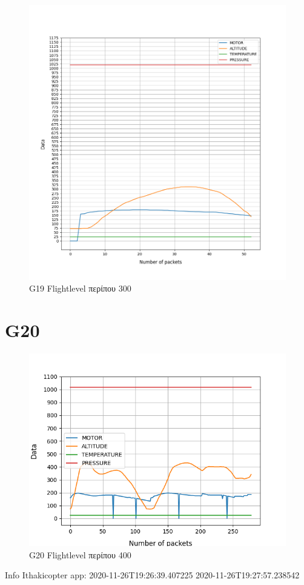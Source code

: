 \documentclass[hidelinks, 12pt, a4paper]{article}
\begin{document}
\begin{figure}[h!]
\centering
	\includegraphics[height=.4\textheight, width=\textwidth]{assets/session1/g19.png}
    \caption{G19 Flightlevel περίπου 300}
\end{figure}

\section{G20}

\begin{figure}[h!]
\centering
	\includegraphics[height=.4\textheight, width=\textwidth]{assets/session1/g20.png}
    \caption{G20 Flightlevel περίπου 400}
\end{figure}
Info Ithakicopter app:
2020-11-26T19:26:39.407225
2020-11-26T19:27:57.238542
\end{document}
